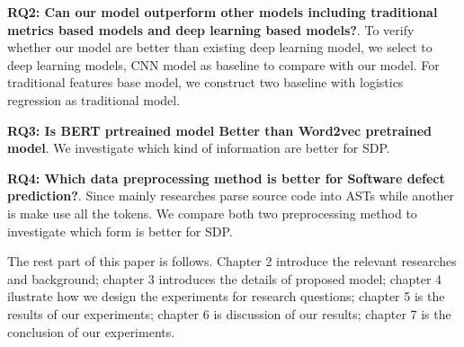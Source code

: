 \textbf{RQ2: Can our model outperform other models including traditional metrics based models and deep learning based models?}. To verify whether our model are better than existing deep learning model, we select to deep learning models, CNN model as baseline to compare with our model. For traditional features base model, we construct two baseline with logistics regression as traditional model.

\textbf{RQ3: Is BERT prtreained model Better than Word2vec pretrained model}. We investigate which kind of information are better for SDP.

\textbf{RQ4: Which data preprocessing method is better for Software defect prediction?}. Since mainly researches parse source code into ASTs while another is make use all the tokens. We compare both two preprocessing method to investigate which form is better for SDP.

The rest part of this paper is follows. Chapter 2 introduce the relevant researches and background; chapter 3 introduces the details of proposed model; chapter 4 ilustrate how we design the experiments for research questions; chapter 5 is the results of our experiments; chapter 6 is discussion of our results; chapter 7 is the conclusion of our experiments.





